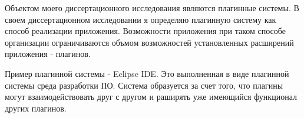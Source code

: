 
Объектом моего диссертационного исследования являются плагинные системы. В своем диссертационном исследовании я определяю плагинную систему как способ реализации приложения. Возможности приложения при таком способе организации ограничиваются объмом возможностей установленных расширений приложения - плагинов.

Пример плагинной системы - Eclipse IDE. Это выполненная в виде плагинной системы среда разработки ПО. Система образуется за счет того, что плагины могут взаимодействовать друг с другом и раширять уже имеющийся функционал других плагинов. 
